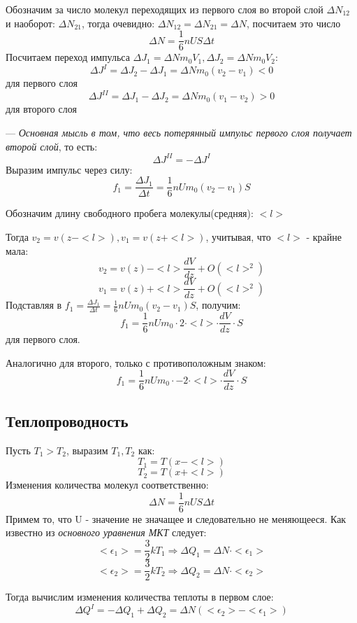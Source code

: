 \vspace{5px}

Обозначим за число молекул переходящих из первого слоя во второй слой $\Delta N_{12}$ и наоборот: $\Delta N_{21}$, тогда очевидно: $\Delta N_{12} = \Delta N_{21} = \Delta N$, посчитаем это число
\[\Delta N = \frac{1}{6} n U S \Delta t\]
Посчитаем переход импульса $\Delta J_1 = \Delta N m_0V_1 , \Delta J_2 = \Delta N m_0V_2$:
\[\Delta J^{I} = \Delta J_2 - \Delta J_1 = \Delta N m_0(v_2 - v_1) < 0\]
для первого слоя
\newpage
\[\Delta J^{II} = \Delta J_1 - \Delta J_2 = \Delta N m_0(v_1 - v_2) > 0\]
для второго слоя

\vspace{5px}

--- \textit{Основная мысль в том, что  весь потерянный импульс первого слоя получает второй слой}, то есть:
\[\Delta J^{II} = -\Delta J^{I}\]
Выразим импульс через силу:
\[f_1 = \frac{\Delta J_1}{\Delta t} = \frac{1}{6}nUm_0(v_2 - v_1)S\]

Обозначим длину свободного пробега молекулы(средняя): $<l>$

\vspace{5px}

Тогда $v_2 = v(z - <l>), v_1 = v(z + <l>)$, учитывая, что $<l>$ - крайне мала:
\[v_2 = v(z) - <l>\frac{dV}{dz} + O(<l>^2)\]
\[v_1 = v(z) + <l>\frac{dV}{dz} + O(<l>^2)\]
Подставляя в $f_1 = \frac{\Delta J_1}{\Delta t} = \frac{1}{6}nUm_0(v_2 - v_1)S$, получим:
\[f_1 = \frac{1}{6}nUm_0 \cdot 2 \cdot <l> \cdot \frac{dV}{dz} \cdot S\]
для первого слоя.

\vspace{5px}

Аналогично для второго, только с противоположным знаком:
\[f_1 = \frac{1}{6}nUm_0 \cdot -2 \cdot <l> \cdot \frac{dV}{dz} \cdot S\]

\subsection{Теплопроводность}
Пусть $T_1 > T_2$, выразим $T_1, T_2$ как:
\[T_1 = T(x - <l>)\]
\[T_2 = T(x+<l>)\]
Изменения количества молекул соответственно:
\[\Delta N = \frac{1}{6}nUS\Delta t\]
Примем то, что U - значение не значащее и следовательно не меняющееся. Как известно из \textit{основного уравнения МКТ} следует:
\[<\epsilon_1> = \frac{3}{2}kT_1 \Rightarrow \Delta Q_1 = \Delta N \cdot <\epsilon_1>\]
\[<\epsilon_2> = \frac{3}{2}kT_2 \Rightarrow \Delta Q_2 = \Delta N \cdot <\epsilon_2>\]

Тогда вычислим изменения количества теплоты в первом слое:
\[ \Delta Q ^{I} = -\Delta Q_1 + \Delta Q_2 = \Delta N(<\epsilon_2> - <\epsilon_1>)\]

